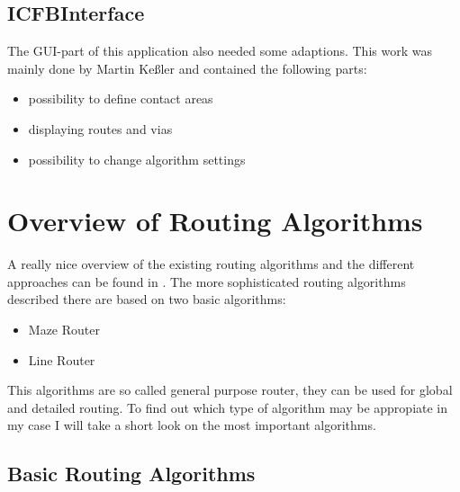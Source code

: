\subsection{ICFBInterface}
The GUI-part of this application also needed some adaptions. This work was mainly done by Martin Keßler and contained the following parts:

\begin{itemize}
\item possibility to define contact areas
\item displaying routes and vias
\item possibility to change algorithm settings
\end{itemize}	

\section{Overview of Routing Algorithms}
A really nice overview of the existing routing algorithms and the different approaches can be found in \cite[page 149 till 201]{springer:eda_analog_routing}. The more sophisticated routing algorithms described there are based on two basic algorithms:
\begin{itemize}
\item Maze Router
\item Line Router
\end{itemize}
This algorithms are so called general purpose router, they can be used for global and detailed routing. To find out which type of algorithm may be appropiate in my case I will take a short look on the most important algorithms.

\subsection{Basic Routing Algorithms}
